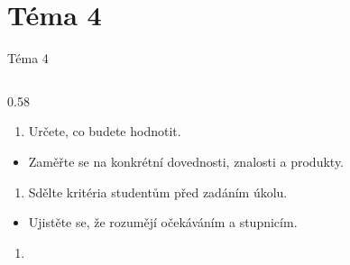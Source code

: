 \documentclass[aspectratio=169]{beamer}
\begin{document}
\section{Téma 4}
\begin{frame}{Téma 4}
\begin{columns}[T,onlytextwidth]
\begin{column}{0.58\textwidth}
\scriptsize
\begin{enumerate}

\def\labelenumi{\arabic{enumi})}

\tightlist

\item

  Určete, co budete hodnotit.

\end{enumerate}


\begin{itemize}

\tightlist

\item

  Zaměřte se na konkrétní dovednosti, znalosti a produkty.

\end{itemize}


\begin{enumerate}

\def\labelenumi{\arabic{enumi})}

\setcounter{enumi}{1}

\tightlist

\item

  Sdělte kritéria studentům před zadáním úkolu.

\end{enumerate}


\begin{itemize}

\tightlist

\item

  Ujistěte se, že rozumějí očekáváním a stupnicím.

\end{itemize}


\begin{enumerate}

\def\labelenumi{\arabic{enumi})}

\setcounter{enumi}{2}

\tightlist

\item


\end{enumerate}
\end{column}
\end{columns}
\end{frame}
\end{document}
